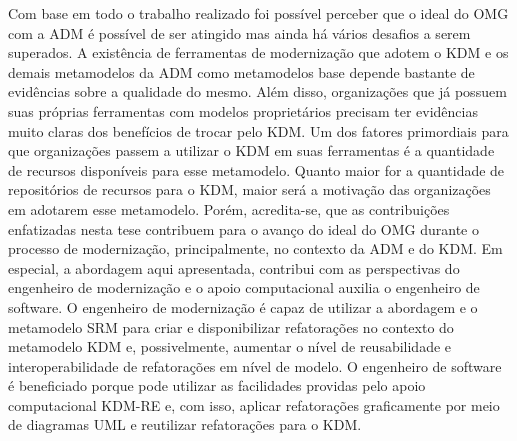 Com base em todo o trabalho realizado foi possível perceber que o ideal do OMG com a ADM é possível de ser atingido mas ainda há vários desafios a serem superados. A existência de ferramentas de modernização que adotem o KDM e os demais metamodelos da ADM como metamodelos base depende bastante de evidências sobre a qualidade do mesmo. Além disso, organizações que já possuem suas próprias ferramentas com modelos proprietários precisam ter evidências muito claras dos benefícios de trocar pelo KDM.  Um dos fatores primordiais para que organizações passem a utilizar o KDM em suas ferramentas é a quantidade de recursos disponíveis para esse metamodelo. Quanto maior for a quantidade de repositórios de recursos para o KDM, maior será a motivação das organizações em adotarem esse metamodelo. Porém, acredita-se, que as contribuições enfatizadas nesta tese contribuem para o avanço do ideal do OMG durante o processo de modernização, principalmente, no contexto da ADM e do KDM. Em especial, a abordagem aqui apresentada, contribui com as perspectivas do engenheiro de modernização e o apoio computacional auxilia o engenheiro de software. O engenheiro de modernização é capaz de utilizar a abordagem e o metamodelo SRM para criar e disponibilizar refatorações no contexto do metamodelo KDM e, possivelmente, aumentar o nível de reusabilidade e interoperabilidade de refatorações em nível de modelo. O engenheiro de software é beneficiado porque pode utilizar as facilidades providas pelo apoio computacional KDM-RE e, com isso, aplicar refatorações graficamente por meio de diagramas UML e reutilizar refatorações para o KDM.





